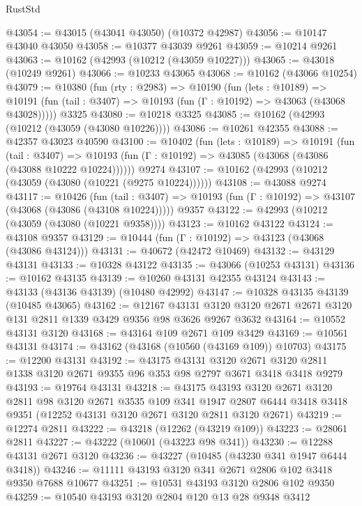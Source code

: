 \begin{lexlean}{RustStd}
\begin{coremodule}
@43054 := @43015 (@43041 @43050) (@10372 @42987)
@43056 := @10147 @43040 @43050
@43058 := @10377 @43039 @9261
@43059 := @10214 @9261
@43063 := @10162 (@42993 (@10212 (@43059 @10227)))
@43065 := @43018 (@10249 @9261)
@43066 := @10233 @43065
@43068 := @10162 (@43066 @10254)
@43079 := @10380
    (fun (rty : @2983) =>
    @10190
      (fun (lets : @10189) =>
      @10191 (fun (tail : @3407) => @10193 (fun (Γ : @10192) => @43063 (@43068 @43028)))))
    @3325
@43080 := @10218 @3325
@43085 := @10162 (@42993 (@10212 (@43059 (@43080 @10226))))
@43086 := @10261 @42355
@43088 := @42357 @43023 @40590
@43100 := @10402
    (fun (lets : @10189) =>
    @10191
      (fun (tail : @3407) =>
      @10193 (fun (Γ : @10192) => @43085 (@43068 (@43086 (@43088 @10222 @10224))))))
    @9274
@43107 := @10162 (@42993 (@10212 (@43059 (@43080 (@10221 (@9275 @10224))))))
@43108 := @43088 @9274
@43117 := @10426
    (fun (tail : @3407) => @10193 (fun (Γ : @10192) => @43107 (@43068 (@43086 (@43108 @10224)))))
    @9357
@43122 := @42993 (@10212 (@43059 (@43080 (@10221 @9358))))
@43123 := @10162 @43122
@43124 := @43108 @9357
@43129 := @10444 (fun (Γ : @10192) => @43123 (@43068 (@43086 @43124)))
@43131 := @40672 (@42472 @10469)
@43132 := @43129 @43131
@43133 := @10328 @43122
@43135 := @43066 (@10253 @43131)
@43136 := @10162 @43135
@43139 := @10260 @43131 @42355 @43124
@43143 := @43133 (@43136 @43139) (@10480 @42992)
@43147 := @10328 @43135 @43139 (@10485 @43065)
@43162 := @12167
    @43131
    @3120
    @3120
    @2671
    @2671
    @3120
    @131
    @2811
    @1339
    @3429
    @9356
    @98
    @3626
    @9267
    @3632
@43164 := @10552 @43131 @3120
@43168 := @43164 @109 @2671 @109 @3429
@43169 := @10561 @43131
@43174 := @43162 (@43168 (@10560 (@43169 @109)) @10703)
@43175 := @12200 @43131
@43192 := @43175
    @43131
    @3120
    @2671
    @3120
    @2811
    @1338
    @3120
    @2671
    @9355
    @96
    @353
    @98
    @2797
    @3671
    @3418
    @3418
    @9279
@43193 := @19764 @43131
@43218 := @43175
    @43193
    @3120
    @2671
    @3120
    @2811
    @98
    @3120
    @2671
    @3535
    @109
    @341
    @1947
    @2807
    @6444
    @3418
    @3418
    @9351
    (@12252 @43131 @3120 @2671 @3120 @2811 @3120 @2671)
@43219 := @12274 @2811
@43222 := @43218 (@12262 (@43219 @109))
@43223 := @28061 @2811
@43227 := @43222 (@10601 (@43223 @98 @341))
@43230 := @12288 @43131 @2671 @3120
@43236 := @43227 (@10485 (@43230 @341 @1947 @6444 @3418))
@43246 := @11111 @43193 @3120 @341 @2671 @2806 @102 @3418 @9350 @7688 @10677
@43251 := @10531 @43193 @3120 @2806 @102 @9350
@43259 := @10540 @43193 @3120 @2804 @120 @13 @28 @9348 @3412

\end{coremodule}
\end{lexlean}
